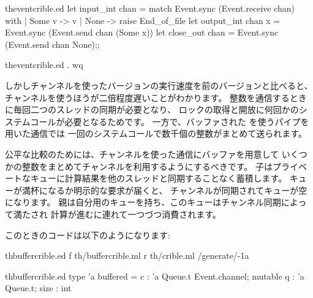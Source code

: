 \begin{example}
\begin{listingcodefile}{theventcrible.ed}
let input_int chan =
  match Event.sync (Event.receive chan) with
  | Some v -> v
  | None -> raise End_of_file
let output_int chan x = Event.sync (Event.send chan (Some x))
let close_out chan = Event.sync (Event.send chan None);;
\end{listingcodefile}
%
\begin{codefile}{theventcrible.ed}
.
wq
\end{codefile}

しかしチャンネルを使ったバージョンの実行速度を前のバージョンと比べると、
チャンネルを使うほうが二倍程度遅いことがわかります。
整数を通信するときに毎回二つのスレッドの同期が必要となり、
ロックの取得と開放に何回かのシステムコールが必要となるためです。
一方で、バッファされた \io を使うパイプを用いた通信では
一回のシステムコールで数千個の整数がまとめて送られます。

公平な比較のためには、チャンネルを使った通信にバッファを用意して
いくつかの整数をまとめてチャンネルを利用するようにするべきです。
子はプライベートなキューに計算結果を他のスレッドと同期することなく蓄積します。
キューが満杯になるか明示的な要求が届くと、
チャンネルが同期されてキューが空になります。
親は自分用のキューを持ち、このキューはチャンネル同期によって満たされ
計算が進むに連れて一つづつ消費されます。

このときのコードは以下のようになります:
%
\begin{codefile}{thbuffercrible.ed}
f th/buffercrible.ml
r th/crible.ml
/generate/-1a
\end{codefile}
%
\begin{listingcodefile}{thbuffercrible.ed}
type 'a buffered =
    { c : 'a Queue.t Event.channel;
      mutable q : 'a Queue.t;
      size : int }


\end{listingcodefile}
\end{example}
